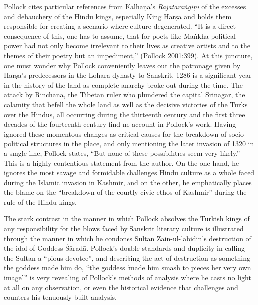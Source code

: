 Pollock cites particular references from Kalhaṇa’s {\sl Rājataraṅgiṇī} of the excesses and debauchery of the Hindu kings, especially King Harṣa and holds them responsible for creating a scenario where culture degenerated. “It is a direct consequence of this, one has to assume, that for poets like Maṅkha political power had not only become irrelevant to their lives as creative artists and to the themes of their poetry but an impediment,” (Pollock 2001:399). At this juncture, one must wonder why Pollock conveniently leaves out the patronage given by Harṣa’s predecessors in the Lohara dynasty to Sanskrit. 1286 is a significant year in the history of the land as complete anarchy broke out during the time. The attack by Rinchana, the Tibetan ruler who plundered the capital Srinagar, the calamity that befell the whole land as well as the decisive victories of the Turks over the Hindus, all occurring during the thirteenth century and the first three decades of the fourteenth century find no account in Pollock’s work. Having ignored these momentous changes as critical causes for the breakdown of socio-political structures in the place, and only mentioning the later invasion of 1320 in a single line, Pollock states, “But none of these possibilities seem very likely.” This is a highly contentious statement from the author. On the one hand, he ignores the most savage and formidable challenges Hindu culture as a whole faced during the Islamic invasion in Kashmir, and on the other, he emphatically places the blame on the “breakdown of the courtly-civic ethos of Kashmir” during the rule of the Hindu kings.

The stark contrast in the manner in which Pollock absolves the Turkish kings of any responsibility for the blows faced by Sanskrit literary culture is illustrated through the manner in which he condones Sultan Zain-ul-'abidin’s destruction of the idol of Goddess Śāradā. Pollock’s double standards and duplicity in calling the Sultan a “pious devotee”, and describing the act of destruction as something the goddess made him do, “the goddess ‘made him smash to pieces her very own image’” is very revealing of Pollock’s methods of analysis where he casts no light at all on any observation, or even the historical evidence that challenges and counters his tenuously built analysis.

